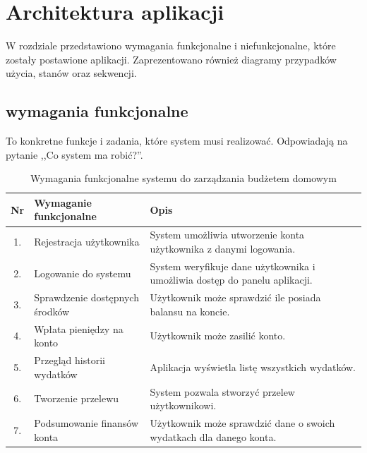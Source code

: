 \chapter{Architektura aplikacji}
W rozdziale przedstawiono wymagania funkcjonalne i niefunkcjonalne, które zostały postawione aplikacji. Zaprezentowano również diagramy przypadków użycia, stanów oraz sekwencji.
\section{wymagania funkcjonalne}
To konkretne funkcje i zadania, które system musi realizować. Odpowiadają na pytanie ,,Co system ma robić?''.
\begin{table}[!h]
	\centering
	\renewcommand{\arraystretch}{1.3}
	\setlength{\tabcolsep}{6pt}
	\begin{tabular}{|c|p{5cm}|p{8cm}|}
		\hline
		\textbf{Nr} & \textbf{Wymaganie funkcjonalne} & \textbf{Opis} \\ \hline
		
		1. & Rejestracja użytkownika & System umożliwia utworzenie konta użytkownika z danymi logowania. \\ \hline
		2. & Logowanie do systemu & System weryfikuje dane użytkownika i umożliwia dostęp do panelu aplikacji. \\ \hline
		3. & Sprawdzenie dostępnych środków & Użytkownik może sprawdzić ile posiada balansu na koncie. \\ \hline
		4. & Wpłata pieniędzy na konto & Użytkownik może zasilić konto. \\ \hline
		5. & Przegląd historii wydatków & Aplikacja wyświetla listę wszystkich wydatków. \\ \hline
		6. & Tworzenie przelewu & System pozwala stworzyć przelew użytkownikowi. \\ \hline
		7. & Podsumowanie finansów konta & Użytkownik może sprawdzić dane o swoich wydatkach dla danego konta. \\ \hline
		
	\end{tabular}
	\caption{Wymagania funkcjonalne systemu do zarządzania budżetem domowym}
	\label{tab:wymagania_funkcjonalne}
\end{table}

